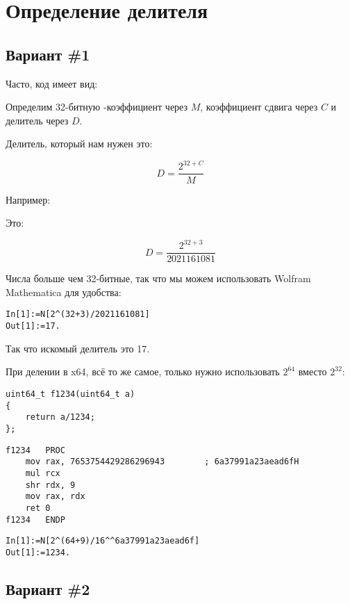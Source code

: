 ﻿\section{Определение делителя}

\subsection{Вариант \#1}

Часто, код имеет вид:



Определим 32-битную -коэффициент через $M$, коэффициент сдвига через $C$ и делитель через $D$.

Делитель, который нам нужен это:

\[
D=\frac{2^{32 + C}}{M}
\]

Например:



Это:

\[
D=\frac{2^{32 + 3}}{2021161081}
\]

Числа больше чем 32-битные, так что мы можем использовать Wolfram Mathematica для удобства:

\begin{lstlisting}[caption=Wolfram Mathematica]
In[1]:=N[2^(32+3)/2021161081]
Out[1]:=17.
\end{lstlisting}

Так что искомый делитель это 17.

При делении в x64, всё то же самое, только нужно использовать $2^{64}$ вместо $2^{32}$:

\begin{lstlisting}
uint64_t f1234(uint64_t a)
{
	return a/1234;
};
\end{lstlisting}

\begin{lstlisting}[caption=\Optimizing MSVC 2012 x64]
f1234	PROC
	mov	rax, 7653754429286296943		; 6a37991a23aead6fH
	mul	rcx
	shr	rdx, 9
	mov	rax, rdx
	ret	0
f1234	ENDP
\end{lstlisting}

\begin{lstlisting}[caption=Wolfram Mathematica]
In[1]:=N[2^(64+9)/16^^6a37991a23aead6f]
Out[1]:=1234.
\end{lstlisting}

\subsection{Вариант \#2}

